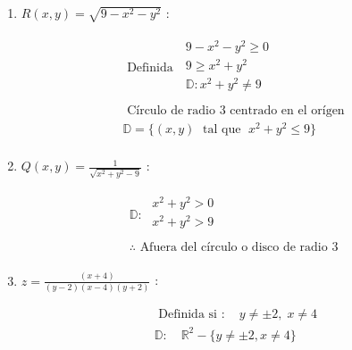 \begin{enumerate}
    \item $R(x,y)= \sqrt{9-x^2-y^2}$ : 
        \begin{center}
           \begin{align*}
               \text{  Definida  } \; \begin{matrix}
                   9-x^2-y^2 \geq 0 \\ 
                   9 \geq x^2 + y^2 \\ 
                   \mathbb{D}: x^2+y^2 \neq 9 \\ 
               \end{matrix} \\ 
               \text{  Círculo de radio 3 centrado en el orígen  } \\ 
               \mathbb{D} = \{(x,y) \; \text{  tal que  } \; x^2+y^2 \leq 9  \} \\ 
           \end{align*}
        \end{center}
    
    \item $Q(x,y)=\frac{1}{\sqrt{x^2+y^2-9}} $ : 
        \begin{center}
           \begin{align*}
               \mathbb{D}: \; \begin{matrix}
                   x^2+y^2 > 0 \\ 
                   x^2+y^2 > 9 \\ 
               \end{matrix} \\ 
               \therefore \text{  Afuera del círculo o disco de radio 3  } \\ 
           \end{align*}
        \end{center}
    
    \item $ z = \frac{(x+4)}{(y-2)(x-4)(y+2)} $ : 
        \begin{center}
           \begin{align*}
               \text{  Definida si  }: \quad y \neq \pm 2, \; x\neq 4 \\ 
               \mathbb{D}: \quad \mathbb{R}^2-  \{y\neq \pm 2, x\neq 4\} \\ 
           \end{align*}
        \end{center}
    

\end{enumerate}
